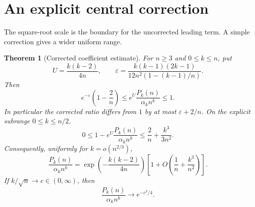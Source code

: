 \documentclass[11pt]{article}
\newtheorem{theorem}{Theorem}[section]
\theoremstyle{definition}
\theoremstyle{remark}
\newcommand{\eps}{\varepsilon}
\begin{document}
\section{An explicit central correction}\label{cta:us:sec:correction}

The square-root scale is the boundary for the uncorrected leading term.
A simple correction gives a wider uniform range.

\begin{theorem}[Corrected coefficient estimate]\label{cta:us:thm:corrected}
For $n\ge3$ and $0\le k\le n$, put
\begin{equation}\label{cta:us:eq:Uepsilon}
 U=\frac{k(k-2)}{4n},\qquad
 \eps=\frac{k(k-1)(2k-1)}{12n^2(1-(k-1)/n)}.
\end{equation}
Then
\begin{equation}\label{cta:us:eq:corrected}
 e^{-\eps}\left(1-\frac2n\right)
 \le e^U\frac{P_k(n)}{\alpha_kn^k}\le1.
\end{equation}
In particular the corrected ratio differs from $1$ by at most
$\eps+2/n$. On the explicit subrange $0\le k\le n/2$,
\begin{equation}\label{cta:us:eq:explicit-error}
 0\le1-e^U\frac{P_k(n)}{\alpha_kn^k}
 \le\frac2n+\frac{k^3}{3n^2}.
\end{equation}
Consequently, uniformly for $k=o(n^{2/3})$,
\begin{equation}\label{cta:us:eq:central-asymptotic}
 \frac{P_k(n)}{\alpha_kn^k}
 =\exp\left(-\frac{k(k-2)}{4n}\right)
       \left[1+O\left(\frac1n+\frac{k^3}{n^2}\right)\right].
\end{equation}
If $k/\sqrt n\to c\in(0,\infty)$, then
\begin{equation}\label{cta:us:eq:sqrt-transition}
 \frac{P_k(n)}{\alpha_kn^k}\longrightarrow e^{-c^2/4}.
\end{equation}
\end{theorem}
\end{document}
